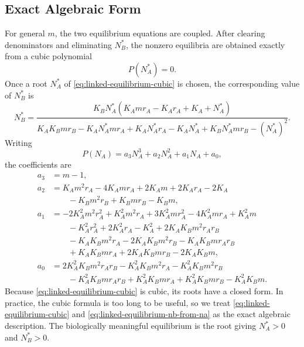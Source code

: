 \documentclass{article}
\numberwithin{equation}{section}
\begin{document}
\subsection{Exact Algebraic Form}
For general $m$, the two equilibrium equations are coupled. After
clearing denominators and eliminating $N_B^*$, the nonzero equilibria are
obtained exactly from a cubic polynomial
\begin{equation}
    \label{eq:linked-equilibrium-cubic}
    P(N_A^*)=0.
\end{equation}
Once a root $N_A^*$ of \eqref{eq:linked-equilibrium-cubic} is chosen,
the corresponding value of $N_B^*$ is
\begin{equation}
    \label{eq:linked-equilibrium-nb-from-na}
    N_B^*
    =
    \frac{
        K_B N_A^*
        \left(K_A m r_A - K_A r_A + K_A + N_A^*\right)
    }{
        K_AK_Bmr_B
        -K_A N_A^*mr_A
        +K_A N_A^*r_A
        -K_A N_A^*
        +K_B N_A^*mr_B
        -(N_A^*)^2
    }.
\end{equation}
Writing
$$
    P(N_A)=a_3N_A^3+a_2N_A^2+a_1N_A+a_0,
$$
the coefficients are
\begin{align*}
    a_3 &= m-1,\\
    a_2
        &= K_A m^2r_A -4K_A mr_A +2K_A m +2K_A r_A -2K_A\\
        &\qquad{} -K_Bm^2r_B +K_Bmr_B-K_Bm,\\
    a_1
        &= -2K_A^2m^2r_A^2+K_A^2m^2r_A+3K_A^2mr_A^2
           -4K_A^2mr_A+K_A^2m\\
        &\qquad{} -K_A^2r_A^2+2K_A^2r_A-K_A^2
           +2K_AK_Bm^2r_Ar_B\\
        &\qquad{} -K_AK_Bm^2r_A-2K_AK_Bm^2r_B
           -K_AK_Bmr_Ar_B\\
        &\qquad{} +K_AK_Bmr_A+2K_AK_Bmr_B-2K_AK_Bm,\\
    a_0
        &= 2K_A^2K_Bm^2r_Ar_B-K_A^2K_Bm^2r_A
           -K_A^2K_Bm^2r_B\\
        &\qquad{} -K_A^2K_Bmr_Ar_B+K_A^2K_Bmr_A
           +K_A^2K_Bmr_B-K_A^2K_Bm.
\end{align*}
Because \eqref{eq:linked-equilibrium-cubic} is cubic, its roots have a
closed form. In practice, the cubic formula is too long to be useful, so
we treat \eqref{eq:linked-equilibrium-cubic} and
\eqref{eq:linked-equilibrium-nb-from-na} as the exact algebraic
description. The biologically meaningful equilibrium is the root giving
$N_A^*>0$ and $N_B^*>0$.
\end{document}
